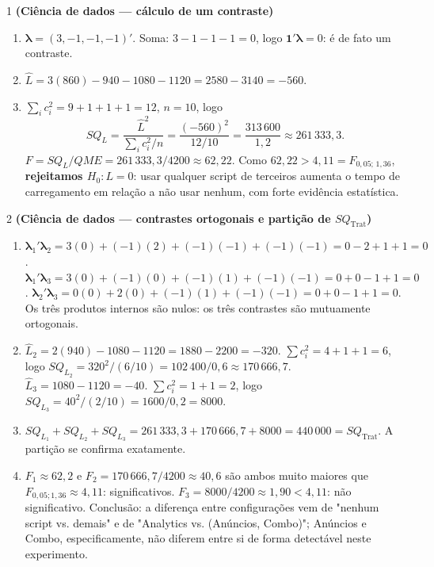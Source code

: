 \documentclass[11pt]{article}
\begin{document}

\begin{questao}{1} \textbf{(Ciência de dados --- cálculo de um contraste)}
\end{questao}
\begin{solucao}
\begin{enumerate}[label=(\alph*)]
  \item $\boldsymbol\lambda = (3, -1, -1, -1)'$. Soma: $3 - 1 - 1 - 1 = 0$, logo
    $\mathbf 1'\boldsymbol\lambda = 0$: é de fato um contraste.
  \item $\hat L = 3(860) - 940 - 1080 - 1120 = 2580 - 3140 = -560$.
  \item $\sum_i c_i^2 = 9+1+1+1 = 12$, $n=10$, logo
    \[
    SQ_L = \frac{\hat L^2}{\sum_i c_i^2/n} = \frac{(-560)^2}{12/10} = \frac{313\,600}{1{,}2} \approx
    261\,333{,}3.
    \]
    $F = SQ_L/QME = 261\,333{,}3/4200 \approx 62{,}22$. Como $62{,}22 > 4{,}11 =
    F_{0{,}05;\,1,36}$, \textbf{rejeitamos $H_0: L=0$}: usar qualquer script de terceiros
    aumenta o tempo de carregamento em relação a não usar nenhum, com forte evidência
    estatística.
\end{enumerate}
\end{solucao}

\begin{questao}{2} \textbf{(Ciência de dados --- contrastes ortogonais e partição de $SQ_{\text{Trat}}$)}
\end{questao}
\begin{solucao}
\begin{enumerate}[label=(\alph*)]
  \item $\boldsymbol\lambda_1'\boldsymbol\lambda_2 = 3(0)+(-1)(2)+(-1)(-1)+(-1)(-1) = 0-2+1+1=0$.
    $\boldsymbol\lambda_1'\boldsymbol\lambda_3 = 3(0)+(-1)(0)+(-1)(1)+(-1)(-1) = 0+0-1+1=0$.
    $\boldsymbol\lambda_2'\boldsymbol\lambda_3 = 0(0)+2(0)+(-1)(1)+(-1)(-1) = 0+0-1+1=0$. Os três
    produtos internos são nulos: os três contrastes são mutuamente ortogonais.
  \item $\hat L_2 = 2(940) - 1080 - 1120 = 1880-2200=-320$. $\sum c_i^2 = 4+1+1=6$, logo
    $SQ_{L_2} = 320^2/(6/10) = 102\,400/0{,}6 \approx 170\,666{,}7$.
    $\hat L_3 = 1080-1120=-40$. $\sum c_i^2=1+1=2$, logo $SQ_{L_3}=40^2/(2/10)=1600/0{,}2=8000$.
  \item $SQ_{L_1}+SQ_{L_2}+SQ_{L_3} = 261\,333{,}3 + 170\,666{,}7 + 8000 = 440\,000 = SQ_{\text{Trat}}$.
    A partição se confirma exatamente.
  \item $F_1 \approx 62{,}2$ e $F_2 = 170\,666{,}7/4200 \approx 40{,}6$ são ambos muito maiores
    que $F_{0{,}05;1,36}\approx 4{,}11$: significativos. $F_3 = 8000/4200 \approx 1{,}90 < 4{,}11$:
    não significativo. Conclusão: a diferença entre configurações vem de "nenhum script vs.
    demais" e de "Analytics vs. (Anúncios, Combo)"; Anúncios e Combo, especificamente, não
    diferem entre si de forma detectável neste experimento.
\end{enumerate}
\end{solucao}
\end{document}
